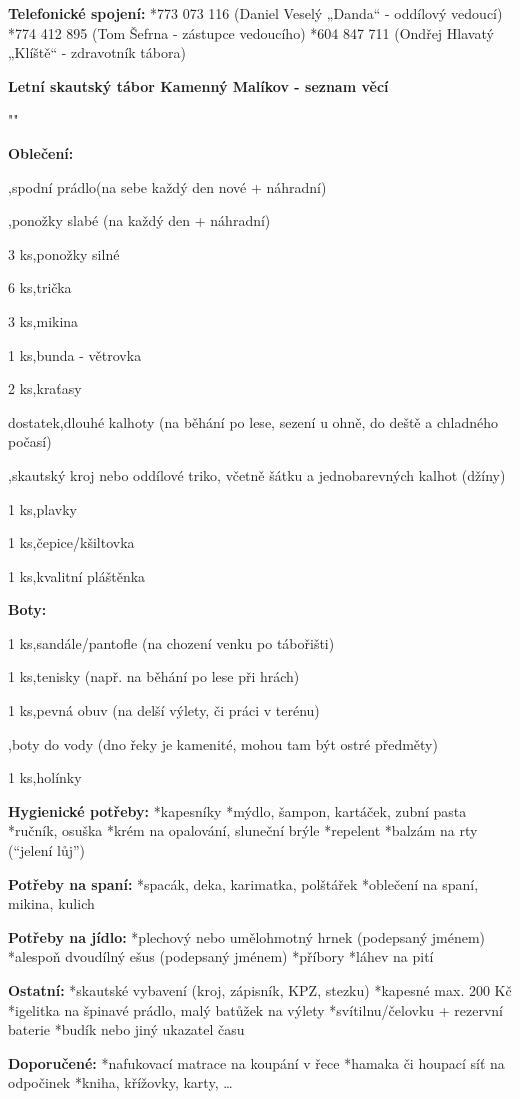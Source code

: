 \parindent=0cm

{\bf Telefonické spojení:}
\begitems
*773 073 116 (Daniel Veselý „Danda“ - oddílový vedoucí)
*774 412 895 (Tom Šefrna - zástupce vedoucího)
*604 847 711 (Ondřej Hlavatý „Klíště“ - zdravotník tábora)
\enditems
\vfil\break

\centerline{\typosize[14/13]\bf Letní skautský tábor Kamenný Malíkov - seznam věcí}
\bigskip
{{ "\def\item#1,#2{\par\hbox{\hbox to 2cm{#1\hfil}#2\hfil}}" }}


{\bf Oblečení:}\smallskip
\item,{spodní prádlo(na sebe každý den nové + náhradní)}
\item,{ponožky slabé (na každý den + náhradní)}
\item{3 ks},{ponožky silné}
\item{6 ks},{trička}
\item{3 ks},{mikina}
\item{1 ks},{bunda - větrovka}
\item{2 ks},{kraťasy}
\item{dostatek},{dlouhé kalhoty (na běhání po lese, sezení u ohně, do deště a chladného počasí)}
\item{},{skautský kroj nebo oddílové triko, včetně šátku a jednobarevných kalhot (džíny)}
\item{1 ks},{plavky}
\item{1 ks},{čepice/kšiltovka}
\item{1 ks},{kvalitní pláštěnka}

\vskip 0.5cm
{\bf Boty:}\smallskip
\item{1 ks},{sandále/pantofle (na chození venku po tábořišti)}
\item{1 ks},{tenisky (např. na běhání po lese při hrách)}
\item{1 ks},{pevná obuv (na delší výlety, či práci v terénu)}
\item{},{boty do vody (dno řeky je kamenité, mohou tam být ostré předměty)}
\item{1 ks},{holínky}
\vskip 0.5cm

{\bf Hygienické potřeby:}\smallskip
\begitems
*kapesníky 
*mýdlo, šampon, kartáček, zubní pasta
*ručník, osuška
*krém na opalování, sluneční brýle
*repelent
*balzám na rty (“jelení lůj”)
\enditems

{\bf Potřeby na spaní:}\smallskip
\begitems
*spacák, deka, karimatka, polštářek
*oblečení na spaní, mikina, kulich
\enditems

{\bf Potřeby na jídlo:}\smallskip
\begitems
*plechový nebo umělohmotný hrnek (podepsaný jménem)
*alespoň dvoudílný ešus (podepsaný jménem)
*příbory
*láhev na pití
\enditems

{\bf Ostatní:}\smallskip
\begitems
*skautské vybavení (kroj, zápisník, KPZ, stezku)
*kapesné max. 200 Kč
*igelitka na špinavé prádlo, malý batůžek na výlety
*svítilnu/čelovku + rezervní baterie
*budík nebo jiný ukazatel času
\enditems

{\bf Doporučené:}\smallskip
\begitems
*nafukovací matrace na koupání v řece
*hamaka či houpací síť na odpočinek
*kniha, křížovky, karty, …
\enditems
\bye
